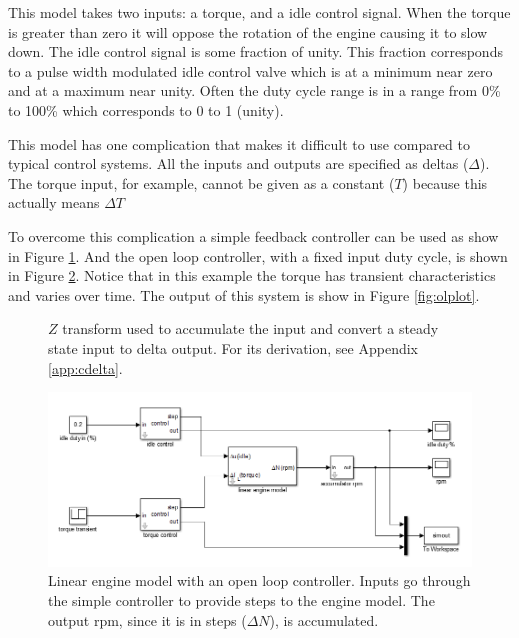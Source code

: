 \documentclass{article}
\begin{document}
This model takes two inputs: a torque, and a idle control signal.
When the torque is greater than zero it will oppose the rotation of
the engine causing it to slow down.
The idle control signal is some fraction of unity.
This fraction corresponds to a pulse width modulated idle control valve
which is at a minimum near zero and at a maximum near unity.
Often the duty cycle range is in a range from 0\% to 100\% which
corresponds to 0 to 1 (unity).

This model has one complication that makes it difficult to use compared
to typical control systems.
All the inputs and outputs are specified as deltas ($\Delta$).
The torque input, for example, cannot be given as a constant ($T$) because this
actually means $\Delta T$

To overcome this complication a simple feedback controller can be used
as show in Figure \ref{fig:scont}.
And the open loop controller, with a fixed input duty cycle, is shown
in Figure \ref{fig:openloop}.
Notice that in this example the torque has transient characteristics and
varies over time.
The output of this system is show in Figure \ref{fig:olplot}.

\clearpage
\begin{figure}[!htbp]
\begin{center}


\end{center}
\caption{$Z$ transform used to accumulate the input and convert
a steady state input to delta output.
For its derivation, see Appendix \ref{app:cdelta}.}
\label{fig:scont}
\end{figure}

\begin{figure}[!htbp]
\begin{center}
\includegraphics[scale=0.5]{img/schematic-no_control-ed1}
\end{center}
\caption{Linear engine model with an open loop controller.
Inputs go through the simple controller to provide steps to the
engine model.
The output rpm, since it is in steps ($\Delta N$), is accumulated.}
\label{fig:openloop}
\end{figure}
\end{document}
